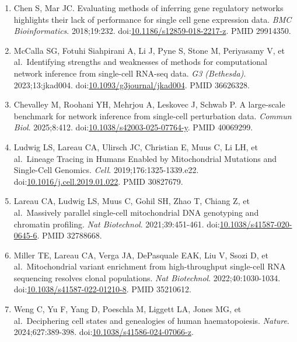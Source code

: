 \documentclass{article}
\begin{document}
\begin{enumerate}
  Saint-Antoine M, Singh A. Benchmarking Gene Regulatory Network
  Inference Methods on Simulated and Experimental Data. \emph{bioRxiv}.
  2023.
  doi:\href{https://doi.org/10.1101/2023.05.12.540581}{10.1101/2023.05.12.540581}.
  PMID 37215029.
\item
  Chen S, Mar JC. Evaluating methods of inferring gene regulatory
  networks highlights their lack of performance for single cell gene
  expression data. \emph{BMC Bioinformatics}. 2018;19:232.
  doi:\href{https://doi.org/10.1186/s12859-018-2217-z}{10.1186/s12859-018-2217-z}.
  PMID 29914350.
\item
  McCalla SG, Fotuhi Siahpirani A, Li J, Pyne S, Stone M, Periyasamy V,
  et al.~Identifying strengths and weaknesses of methods for
  computational network inference from single-cell RNA-seq data.
  \emph{G3 (Bethesda)}. 2023;13:jkad004.
  doi:\href{https://doi.org/10.1093/g3journal/jkad004}{10.1093/g3journal/jkad004}.
  PMID 36626328.
\item
  Chevalley M, Roohani YH, Mehrjou A, Leskovec J, Schwab P. A
  large-scale benchmark for network inference from single-cell
  perturbation data. \emph{Commun Biol}. 2025;8:412.
  doi:\href{https://doi.org/10.1038/s42003-025-07764-y}{10.1038/s42003-025-07764-y}.
  PMID 40069299.
\item
  Ludwig LS, Lareau CA, Ulirsch JC, Christian E, Muus C, Li LH, et
  al.~Lineage Tracing in Humans Enabled by Mitochondrial Mutations and
  Single-Cell Genomics. \emph{Cell}. 2019;176:1325-1339.e22.
  doi:\href{https://doi.org/10.1016/j.cell.2019.01.022}{10.1016/j.cell.2019.01.022}.
  PMID 30827679.
\item
  Lareau CA, Ludwig LS, Muus C, Gohil SH, Zhao T, Chiang Z, et
  al.~Massively parallel single-cell mitochondrial DNA genotyping and
  chromatin profiling. \emph{Nat Biotechnol}. 2021;39:451-461.
  doi:\href{https://doi.org/10.1038/s41587-020-0645-6}{10.1038/s41587-020-0645-6}.
  PMID 32788668.
\item
  Miller TE, Lareau CA, Verga JA, DePasquale EAK, Liu V, Ssozi D, et
  al.~Mitochondrial variant enrichment from high-throughput single-cell
  RNA sequencing resolves clonal populations. \emph{Nat Biotechnol}.
  2022;40:1030-1034.
  doi:\href{https://doi.org/10.1038/s41587-022-01210-8}{10.1038/s41587-022-01210-8}.
  PMID 35210612.
\item
  Weng C, Yu F, Yang D, Poeschla M, Liggett LA, Jones MG, et
  al.~Deciphering cell states and genealogies of human haematopoiesis.
  \emph{Nature}. 2024;627:389-398.
  doi:\href{https://doi.org/10.1038/s41586-024-07066-z}{10.1038/s41586-024-07066-z}.

\end{enumerate}
\end{document}
